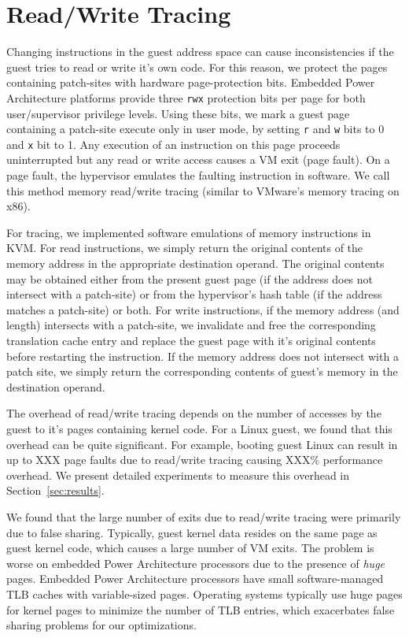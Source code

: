 \documentclass[10pt,twocolumn]{article}
\begin{document}
\section{Read/Write Tracing}
\label{sec:tracing}
Changing instructions in the guest address space can cause
inconsistencies if the guest tries to read or write it's own code.
For this reason, we protect the pages containing patch-sites with hardware
page-protection bits. Embedded Power Architecture platforms provide three {\tt rwx}
protection bits per page for both user/supervisor privilege levels. Using these
bits, we mark a guest page containing a patch-site
execute only in user mode, by setting {\tt r} and {\tt w} bits to 0 and {\tt x} bit to 1.
Any execution of an instruction on this page proceeds uninterrupted
but any read or write access causes a VM exit (page fault).
On a page fault, the hypervisor
emulates the faulting instruction in software. We call this
method memory read/write tracing (similar to VMware's memory tracing
on x86\cite{agesen:comparison}).

For tracing, we implemented software emulations of memory instructions in KVM.
For read instructions, we simply return the original contents of the memory
address in the appropriate destination
operand. The original contents may be obtained either from the present guest
page (if the address does not intersect with a patch-site) or from the hypervisor's
hash table (if the address matches a patch-site) or both.
For write instructions, if the memory address (and length) intersects with a patch-site,
we invalidate and free the corresponding translation cache
entry and replace the guest page with it's original contents before
restarting the instruction. If the memory address does not intersect with a patch
site, we simply return the corresponding contents of guest's memory in the destination
operand.

The overhead of read/write tracing depends on the number of accesses by the guest
to it's pages containing kernel code. For a Linux guest, we found that this overhead
can be quite significant. For example, booting guest Linux can result in
up to XXX page faults due to read/write tracing causing XXX\% performance overhead.
We present detailed experiments to measure this overhead in Section~\ref{sec:results}.

We found that the large number of exits due to read/write tracing were primarily
due to false sharing. Typically, guest kernel data resides on the same page as
guest kernel code, which causes a large number of VM exits. The problem is
worse on embedded Power Architecture processors due to the presence of {\em huge} pages.
Embedded Power Architecture processors have small software-managed
TLB caches with variable-sized pages. Operating systems typically use huge pages for
kernel pages to
minimize the number of TLB entries, which exacerbates false sharing problems for
our optimizations.
\end{document}
